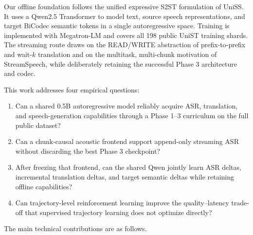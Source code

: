 \documentclass[11pt,a4paper]{article}
\begin{document}
Our offline foundation follows the unified expressive S2ST formulation of UniSS\cite{cheng2025uniss}. It uses a Qwen2.5\cite{yang2024qwen25} Transformer to model text, source speech representations, and target BiCodec semantic tokens in a single autoregressive space. Training is implemented with Megatron-LM\cite{shoeybi2019megatron} and covers all 198 public UniST training shards. The streaming route draws on the READ/WRITE abstraction of prefix-to-prefix and wait-$k$ translation\cite{ma2019stacl} and on the multitask, multi-chunk motivation of StreamSpeech\cite{zhang2024streamspeech}, while deliberately retaining the successful Phase 3 architecture and codec.

This work addresses four empirical questions:

\begin{enumerate}
  \item Can a shared 0.5B autoregressive model reliably acquire ASR, translation, and speech-generation capabilities through a Phase 1--3 curriculum on the full public dataset?
  \item Can a chunk-causal acoustic frontend support append-only streaming ASR without discarding the best Phase 3 checkpoint?
  \item After freezing that frontend, can the shared Qwen jointly learn ASR deltas, incremental translation deltas, and target semantic deltas while retaining offline capabilities?
  \item Can trajectory-level reinforcement learning improve the quality--latency trade-off that supervised trajectory learning does not optimize directly?
\end{enumerate}

The main technical contributions are as follows.
\end{document}
